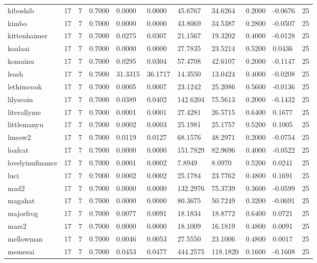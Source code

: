 \begin{table}[htbp]
\begin{tabular}{lllllllllll}
kiboshib & 17 & 7 & 0.7000 & 0.0000 & 0.0000 & 45.6767 & 34.6264 & 0.2000 & -0.0676 & 25 \\
kimbo & 17 & 7 & 0.7000 & 0.0000 & 0.0000 & 43.8069 & 34.5387 & 0.2800 & -0.0507 & 25 \\
kittenhaimer & 17 & 7 & 0.7000 & 0.0275 & 0.0307 & 21.1567 & 19.3202 & 0.4000 & -0.0128 & 25 \\
koalaai & 17 & 7 & 0.7000 & 0.0000 & 0.0000 & 27.7835 & 23.5214 & 0.5200 & 0.0436 & 25 \\
komainu & 17 & 7 & 0.7000 & 0.0295 & 0.0304 & 57.4708 & 42.6107 & 0.2000 & -0.1147 & 25 \\
leash & 17 & 7 & 0.7000 & 31.3315 & 36.1717 & 14.3550 & 13.0424 & 0.4000 & -0.0208 & 25 \\
lethimcook & 17 & 7 & 0.7000 & 0.0005 & 0.0007 & 23.1242 & 25.2086 & 0.5600 & -0.0136 & 25 \\
lilyscoin & 17 & 7 & 0.7000 & 0.0389 & 0.0402 & 142.6204 & 75.5613 & 0.2000 & -0.1432 & 25 \\
literallyme & 17 & 7 & 0.7000 & 0.0001 & 0.0001 & 27.4281 & 26.5715 & 0.6400 & 0.1677 & 25 \\
littlemanyu & 17 & 7 & 0.7000 & 0.0002 & 0.0003 & 25.1981 & 25.1757 & 0.5200 & 0.1005 & 25 \\
lmeow2 & 17 & 7 & 0.7000 & 0.0119 & 0.0127 & 68.1576 & 48.2971 & 0.2000 & -0.0754 & 25 \\
loafcat & 17 & 7 & 0.7000 & 0.0000 & 0.0000 & 151.7829 & 82.9696 & 0.4000 & -0.0522 & 25 \\
lovelyinufinance & 17 & 7 & 0.7000 & 0.0001 & 0.0002 & 7.8949 & 8.0970 & 0.5200 & 0.0241 & 25 \\
luci & 17 & 7 & 0.7000 & 0.0002 & 0.0002 & 25.1784 & 23.7762 & 0.4800 & 0.1691 & 25 \\
mad2 & 17 & 7 & 0.7000 & 0.0000 & 0.0000 & 132.2976 & 75.3739 & 0.3600 & -0.0599 & 25 \\
magahat & 17 & 7 & 0.7000 & 0.0000 & 0.0000 & 80.3675 & 50.7249 & 0.3200 & -0.0691 & 25 \\
majorfrog & 17 & 7 & 0.7000 & 0.0077 & 0.0091 & 18.1834 & 18.8772 & 0.6400 & 0.0721 & 25 \\
mars2 & 17 & 7 & 0.7000 & 0.0000 & 0.0000 & 18.1009 & 16.1819 & 0.4800 & 0.0091 & 25 \\
mellowman & 17 & 7 & 0.7000 & 0.0046 & 0.0053 & 27.5550 & 23.1006 & 0.4800 & 0.0017 & 25 \\
memesai & 17 & 7 & 0.7000 & 0.0453 & 0.0477 & 444.2575 & 118.1820 & 0.1600 & -0.1608 & 25 \\

\end{tabular}
\end{table}
